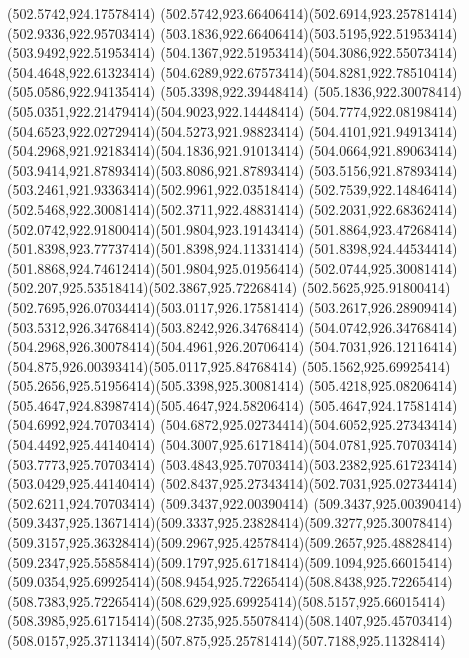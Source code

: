 {{	\closepath
	\moveto(502.5742,924.17578414)
	\curveto(502.5742,923.66406414)(502.6914,923.25781414)(502.9336,922.95703414)
	\curveto(503.1836,922.66406414)(503.5195,922.51953414)(503.9492,922.51953414)
	\curveto(504.1367,922.51953414)(504.3086,922.55073414)(504.4648,922.61323414)
	\curveto(504.6289,922.67573414)(504.8281,922.78510414)(505.0586,922.94135414)
	\lineto(505.3398,922.39448414)
	\curveto(505.1836,922.30078414)(505.0351,922.21479414)(504.9023,922.14448414)
	\curveto(504.7774,922.08198414)(504.6523,922.02729414)(504.5273,921.98823414)
	\curveto(504.4101,921.94913414)(504.2968,921.92183414)(504.1836,921.91013414)
	\curveto(504.0664,921.89063414)(503.9414,921.87893414)(503.8086,921.87893414)
	\curveto(503.5156,921.87893414)(503.2461,921.93363414)(502.9961,922.03518414)
	\curveto(502.7539,922.14846414)(502.5468,922.30081414)(502.3711,922.48831414)
	\curveto(502.2031,922.68362414)(502.0742,922.91800414)(501.9804,923.19143414)
	\curveto(501.8864,923.47268414)(501.8398,923.77737414)(501.8398,924.11331414)
	\curveto(501.8398,924.44534414)(501.8868,924.74612414)(501.9804,925.01956414)
	\curveto(502.0744,925.30081414)(502.207,925.53518414)(502.3867,925.72268414)
	\curveto(502.5625,925.91800414)(502.7695,926.07034414)(503.0117,926.17581414)
	\curveto(503.2617,926.28909414)(503.5312,926.34768414)(503.8242,926.34768414)
	\curveto(504.0742,926.34768414)(504.2968,926.30078414)(504.4961,926.20706414)
	\curveto(504.7031,926.12116414)(504.875,926.00393414)(505.0117,925.84768414)
	\curveto(505.1562,925.69925414)(505.2656,925.51956414)(505.3398,925.30081414)
	\curveto(505.4218,925.08206414)(505.4647,924.83987414)(505.4647,924.58206414)
	\lineto(505.4647,924.17581414)
	\closepath
	\moveto(504.6992,924.70703414)
	\curveto(504.6872,925.02734414)(504.6052,925.27343414)(504.4492,925.44140414)
	\curveto(504.3007,925.61718414)(504.0781,925.70703414)(503.7773,925.70703414)
	\curveto(503.4843,925.70703414)(503.2382,925.61723414)(503.0429,925.44140414)
	\curveto(502.8437,925.27343414)(502.7031,925.02734414)(502.6211,924.70703414)
	\closepath
	\moveto(509.3437,922.00390414)
	\lineto(509.3437,925.00390414)
	\curveto(509.3437,925.13671414)(509.3337,925.23828414)(509.3277,925.30078414)
	\curveto(509.3157,925.36328414)(509.2967,925.42578414)(509.2657,925.48828414)
	\curveto(509.2347,925.55858414)(509.1797,925.61718414)(509.1094,925.66015414)
	\curveto(509.0354,925.69925414)(508.9454,925.72265414)(508.8438,925.72265414)
	\curveto(508.7383,925.72265414)(508.629,925.69925414)(508.5157,925.66015414)
	\curveto(508.3985,925.61715414)(508.2735,925.55078414)(508.1407,925.45703414)
	\curveto(508.0157,925.37113414)(507.875,925.25781414)(507.7188,925.11328414)
}}
